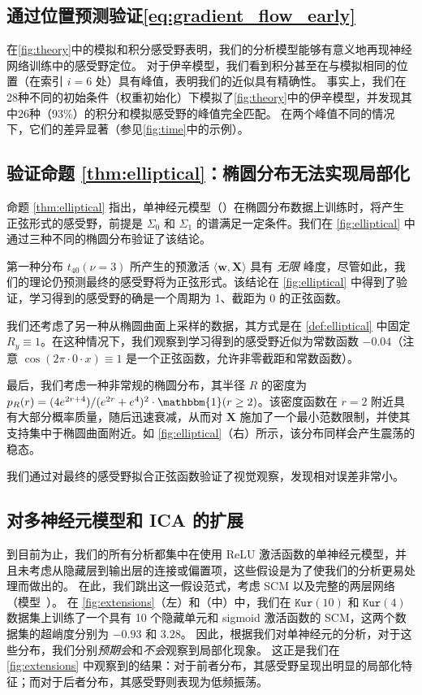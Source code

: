 
\subsection{通过位置预测验证\cref{eq:gradient_flow_early}}
\label{sec:peak-prediction}
在\cref{fig:theory}中的模拟和积分感受野表明，我们的分析模型能够有意义地再现神经网络训练中的感受野定位。
对于伊辛模型，我们看到积分甚至在与模拟相同的位置（在索引 $i=6$ 处）具有峰值，表明我们的近似具有精确性。
事实上，我们在28种不同的初始条件（权重初始化）下模拟了\cref{fig:theory}中的伊辛模型，并发现其中26种（93\%）的积分和模拟感受野的峰值完全匹配。
在两个峰值不同的情况下，它们的差异显著（参见\cref{fig:time}中的示例）。
\subsection{验证命题 \ref{thm:elliptical}：椭圆分布无法实现局部化}
\label{sec:elliptical-experiments}
命题 \ref{thm:elliptical} 指出，单神经元模型（）在椭圆分布数据上训练时，将产生正弦形式的感受野，前提是 $\Sigma_0$ 和 $\Sigma_1$ 的谱满足一定条件。我们在 \cref{fig:elliptical} 中通过三种不同的椭圆分布验证了该结论。

第一种分布 $t_{40}(\nu=3)$ 所产生的预激活 $\langle \mathbf{w}, \mathbf{X} \rangle$ 具有 \emph{无限} 峰度，尽管如此，我们的理论仍预测最终的感受野将为正弦形式。该结论在 \cref{fig:elliptical} 中得到了验证，学习得到的感受野的确是一个周期为 1、截距为 0 的正弦函数。

我们还考虑了另一种从椭圆曲面上采样的数据，其方式是在 \cref{def:elliptical} 中固定 $R_y \equiv 1$。在这种情况下，我们观察到学习得到的感受野近似为常数函数 $-0.04$（注意 $\cos(2\pi \cdot 0 \cdot x) \equiv 1$ 是一个正弦函数，允许非零截距和常数函数）。

最后，我们考虑一种非常规的椭圆分布，其半径 $R$ 的密度为 $p_R(r) = (4e^{2r+4}) / (e^{2r}+e^{4})^{2} \cdot \mathbbm{1}(r \geq 2)$。该密度函数在 $r = 2$ 附近具有大部分概率质量，随后迅速衰减，从而对 $\mathbf{X}$ 施加了一个最小范数限制，并使其支持集中于椭圆曲面附近。如 \cref{fig:elliptical}（右）所示，该分布同样会产生震荡的稳态。

我们通过对最终的感受野拟合正弦函数验证了视觉观察，发现相对误差非常小。
\subsection{对多神经元模型和 ICA 的扩展}
\label{sec:extensions}

到目前为止，我们的所有分析都集中在使用 ReLU 激活函数的单神经元模型，并且未考虑从隐藏层到输出层的连接或偏置项，这些假设是为了使我们的分析更易处理而做出的。
在此，我们跳出这一假设范式，考虑 SCM 以及完整的两层网络（模型~）。
在 \cref{fig:extensions}（左）和（中）中，我们在 $\texttt{Kur}(10)$ 和 $\texttt{Kur}(4)$ 数据集上训练了一个具有 10 个隐藏单元和 sigmoid 激活函数的 SCM，这两个数据集的超峭度分别为 $-0.93$ 和 $3.28$。
因此，根据我们对单神经元的分析，对于这些分布，我们分别\emph{预期会}和\emph{不会}观察到局部化现象。
这正是我们在 \cref{fig:extensions} 中观察到的结果：对于前者分布，其感受野呈现出明显的局部化特征；而对于后者分布，其感受野则表现为低频振荡。

